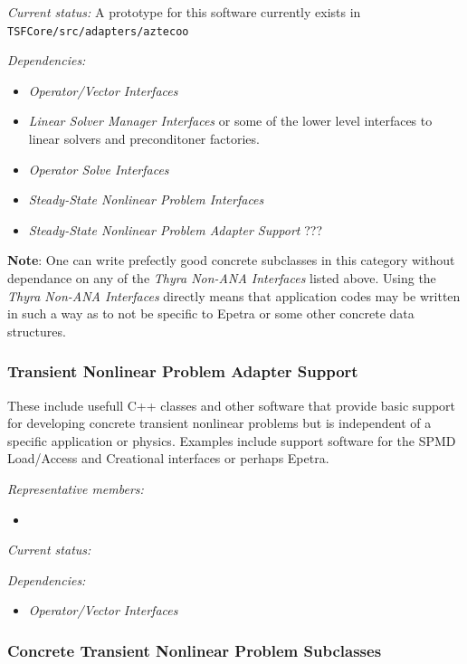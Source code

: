 \documentclass[pdf,ps2pdf,11pt]{SANDreport}
\begin{document}
{}\textit{Current status:} A prototype for this software currently exists in
{}\texttt{TSFCore/src/adapters/aztecoo}

{}\textit{Dependencies:}
\begin{itemize}
\item {}\textit{Operator/Vector Interfaces}
\item {}\textit{Linear Solver Manager Interfaces} or some of the 
lower level interfaces to linear solvers and preconditoner factories.
\item {}\textit{Operator Solve Interfaces}
\item {}\textit{Steady-State Nonlinear Problem Interfaces}
\item {}\textit{Steady-State Nonlinear Problem Adapter Support} ???
\end{itemize}

{}\textbf{Note}: One can write prefectly good concrete subclasses in this
category without dependance on any of the {}\textit{Thyra Non-ANA Interfaces}
listed above.  Using the {}\textit{Thyra Non-ANA Interfaces} directly means
that application codes may be written in such a way as to not be specific to
Epetra or some other concrete data structures.

%
\subsubsection{Transient Nonlinear Problem Adapter Support}
%

These include usefull C++ classes and other software that provide basic
support for developing concrete transient nonlinear problems but is
independent of a specific application or physics.  Examples include support
software for the SPMD Load/Access and Creational interfaces or perhaps Epetra.

{}\textit{Representative members:}
\begin{itemize}
%
{}\item
%
\end{itemize}

{}\textit{Current status:}

{}\textit{Dependencies:}
\begin{itemize}
\item {}\textit{Operator/Vector Interfaces}
\end{itemize}

%
\subsubsection{Concrete Transient Nonlinear Problem Subclasses}
%
\end{document}
